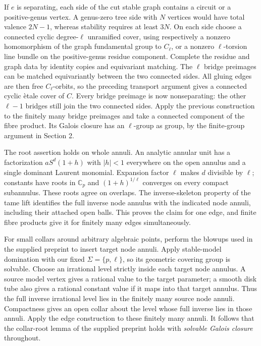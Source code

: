 If $e$ is separating, each side of the cut stable graph contains
a circuit or a positive-genus vertex.  A genus-zero tree side with
$N$ vertices would have total valence $2N-1$, whereas stability
requires at least $3N$.  On each side choose a connected cyclic
degree-$\ell$ unramified cover, using respectively a nonzero
homomorphism of the graph fundamental group to $C_\ell$, or a
nonzero $\ell$-torsion line bundle on the positive-genus residue
component.  Complete the residue and graph data by identity copies
and equivariant matching.  The $\ell$ bridge preimages can be
matched equivariantly between the two connected sides.  All gluing
edges are then free $C_\ell$-orbits, so the preceding transport
argument gives a connected cyclic \`etale cover of $C$.
Every bridge preimage is now nonseparating: the other $\ell-1$
bridges still join the two connected sides.  Apply the previous
construction to the finitely many bridge preimages and take a
connected component of the fibre product.  Its Galois closure has
an $\ell$-group as group, by the finite-group argument in Section 2.

The root assertion holds on whole annuli.  An analytic annular unit
has a factorization $aS^d(1+h)$ with $|h|<1$ everywhere on the open
annulus and a single dominant Laurent monomial.  Expansion factor
$\ell$ makes $d$ divisible by $\ell$; constants have roots in
$\mathbb C_p$ and $(1+h)^{1/\ell}$ converges on every compact
subannulus.  These roots agree on overlaps.  The inverse-skeleton
property of the tame lift identifies the full inverse node annulus
with the indicated node annuli, including their attached open
balls.  This proves the claim for one edge, and finite fibre
products give it for finitely many edges simultaneously.

For small collars around arbitrary algebraic points, perform the
blowups used in the supplied preprint to insert target node annuli.
Apply stable-model domination with our fixed $\Sigma=\{p,\ell\}$,
so its geometric covering group is solvable.  Choose an irrational
level strictly inside each target node annulus.  A source model
vertex gives a rational value to the target parameter; a smooth
disk tube also gives a rational constant value if it maps into that
target annulus.  Thus the full inverse irrational level lies in the
finitely many source node annuli.  Compactness gives an open collar
about the level whose full inverse lies in those annuli.  Apply the
edge construction to these finitely many annuli.  It follows that
the collar-root lemma of the supplied preprint holds with
\emph{solvable Galois closure} throughout.

